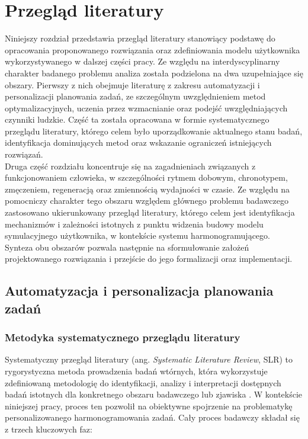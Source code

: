 \section{Przegląd literatury}\label{section_literature}
\quad Niniejszy rozdział przedstawia przegląd literatury stanowiący podstawę do opracowania proponowanego rozwiązania oraz zdefiniowania modelu użytkownika wykorzystywanego w dalszej części pracy. Ze względu na interdyscyplinarny charakter badanego problemu analiza została podzielona na dwa uzupełniające się obszary. Pierwszy z nich obejmuje literaturę z zakresu automatyzacji i personalizacji planowania zadań, ze szczególnym uwzględnieniem metod optymalizacyjnych, uczenia przez wzmacnianie oraz podejść uwzględniających czynniki ludzkie. Część ta została opracowana w formie systematycznego przeglądu literatury, którego celem było uporządkowanie aktualnego stanu badań, identyfikacja dominujących metod oraz wskazanie ograniczeń istniejących rozwiązań.
\\\indent Druga część rozdziału koncentruje się na zagadnieniach związanych z funkcjonowaniem człowieka, w szczególności rytmem dobowym, chronotypem, zmęczeniem, regeneracją oraz zmiennością wydajności w czasie. Ze względu na pomocniczy charakter tego obszaru względem głównego problemu badawczego zastosowano ukierunkowany przegląd literatury, którego celem jest identyfikacja mechanizmów i zależności istotnych z punktu widzenia budowy modelu symulacyjnego użytkownika, w kontekście systemu harmonogramującego.
\\\indent Synteza obu obszarów pozwala następnie na sformułowanie założeń projektowanego rozwiązania i przejście do jego formalizacji oraz implementacji.

\subsection{Automatyzacja i personalizacja planowania zadań}

    \subsubsection{Metodyka systematycznego przeglądu literatury}
\quad Systematyczny przegląd literatury (ang. \textit{Systematic Literature Review}, SLR) to rygorystyczna metoda prowadzenia badań wtórnych, która wykorzystuje zdefiniowaną metodologię do identyfikacji, analizy i interpretacji dostępnych badań istotnych dla konkretnego obszaru badawczego lub zjawiska \cite{kitchenham2007guidelines}. W kontekście niniejszej pracy, proces ten pozwolił na obiektywne spojrzenie na problematykę personalizowanego harmonogramowania zadań. Cały proces badawczy składał się z trzech kluczowych faz:

